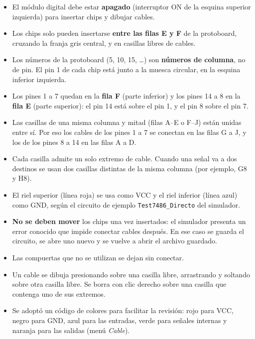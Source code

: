 \documentclass[10pt]{article}
\begin{document}
\begin{itemize}
  \item El módulo digital debe estar \textbf{apagado} (interruptor ON de la
        esquina superior izquierda) para insertar chips y dibujar cables.
  \item Los chips solo pueden insertarse \textbf{entre las filas E y F} de la
        protoboard, cruzando la franja gris central, y en casillas libres de
        cables.
  \item Los números de la protoboard (5, 10, 15, \ldots) son \textbf{números de
        columna}, no de pin. El pin 1 de cada chip está junto a la muesca
        circular, en la esquina inferior izquierda.
  \item Los pines 1 a 7 quedan en la \textbf{fila F} (parte inferior) y los
        pines 14 a 8 en la \textbf{fila E} (parte superior): el pin 14 está
        sobre el pin 1, y el pin 8 sobre el pin 7.
  \item Las casillas de una misma columna y mitad (filas A--E o F--J) están
        unidas entre sí. Por eso los cables de los pines 1 a 7 se conectan en
        las filas G a J, y los de los pines 8 a 14 en las filas A a D.
  \item Cada casilla admite un solo extremo de cable. Cuando una señal va a
        dos destinos se usan dos casillas distintas de la misma columna (por
        ejemplo, G8 y H8).
  \item El riel superior (línea roja) se usa como VCC y el riel inferior
        (línea azul) como GND, según el circuito de ejemplo
        \texttt{Test7486\_Directo} del simulador.
  \item \textbf{No se deben mover} los chips una vez insertados: el simulador
        presenta un error conocido que impide conectar cables después. En ese
        caso se guarda el circuito, se abre uno nuevo y se vuelve a abrir el
        archivo guardado.
  \item Las compuertas que no se utilizan se dejan sin conectar.
  \item Un cable se dibuja presionando sobre una casilla libre, arrastrando y
        soltando sobre otra casilla libre. Se borra con clic derecho sobre una
        casilla que contenga uno de sus extremos.
  \item Se adoptó un código de colores para facilitar la revisión: rojo para
        VCC, negro para GND, azul para las entradas, verde para señales
        internas y naranja para las salidas (menú \textit{Cable}).
\end{itemize}
\end{document}
